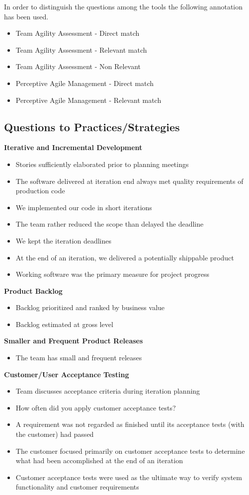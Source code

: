 \newcommand*\taa{\item[\FiveStar]}
\newcommand*\taar{\item[\FiveStarShadow]}
\newcommand*\taanr{\item[\SnowflakeChevron]}
\newcommand*\pam{\item[\AsteriskBold]}
\newcommand*\pamr{\item[\AsteriskThinCenterOpen]}

In order to distinguish the questions among the tools the following annotation has been used. 
\begin{itemize}
  \taa Team Agility Assessment - Direct match
  \taar Team Agility Assessment - Relevant match
  \taanr Team Agility Assessment - Non Relevant
  \pam Perceptive Agile Management - Direct match
  \pamr Perceptive Agile Management - Relevant match
\end{itemize}

\vspace{0.5cm}

\subsection{Questions to Practices/Strategies}

\textbf{Iterative and Incremental Development}
\begin{itemize}
	\taa Stories sufficiently elaborated prior to planning meetings
	\pam The software delivered at iteration end always met quality requirements of production code 
	\pam We implemented our code in short iterations
	\pamr The team rather reduced the scope than delayed the deadline 
	\pamr We kept the iteration deadlines
	\pamr At the end of an iteration, we delivered a potentially shippable product
	\pamr Working software was the primary measure for project progress
\end{itemize}

\textbf{Product Backlog}
\begin{itemize}
	\taa Backlog prioritized and ranked by business value
	\taa Backlog estimated at gross level
\end{itemize}

\textbf{Smaller and Frequent Product Releases}
\begin{itemize}
	\taa The team has small and frequent releases
\end{itemize}

\textbf{Customer/User Acceptance Testing}
\begin{itemize}
	\taa Team discusses acceptance criteria during iteration planning
	\pam How often did you apply customer acceptance tests?
	\pam A requirement was not regarded as finished until its acceptance tests (with the customer) had passed 
	\pamr The customer focused primarily on customer acceptance tests to determine what had been accomplished at the end of an iteration
	\pamr Customer acceptance tests were used as the ultimate way to verify system functionality and customer requirements 
\end{itemize}

